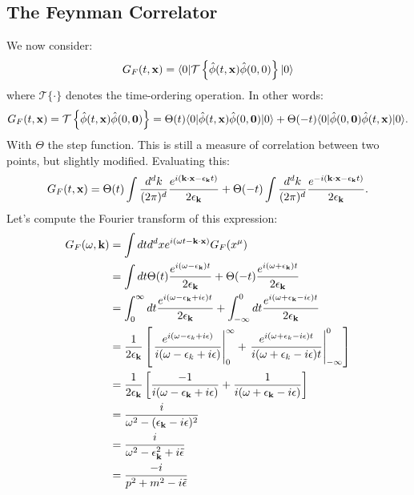 \subsection{The Feynman Correlator}
We now consider:
\begin{equation}
    G_F(t, \mathbf{x}) = \langle 0 \rvert\mathcal{T}\set{\hat{\phi}(t, \ensuremath{\mathbf{x}})\hat{\phi}(0, 0)}\lvert 0 \rangle
\end{equation}
where $\mathcal{T}\{\cdot\}$ denotes the time-ordering operation. In other words:
\begin{equation}
    G_F(t, \mathbf{x}) = \mathcal{T}\set{\hat{\phi}(t, \ensuremath{\mathbf{x}})\hat{\phi}(0, \ensuremath{\mathbf{0}})} = \Theta(t)\langle 0 \rvert\hat{\phi}(t, \mathbf{x})\hat{\phi}(0, \mathbf{0})\lvert 0 \rangle + \Theta(-t)\langle 0 \rvert\hat{\phi}(0, \mathbf{0})\hat{\phi}(t, \mathbf{x})\lvert 0 \rangle.
\end{equation}
With $\Theta$ the step function. This is still a measure of correlation between two points, but slightly modified. Evaluating this:
\begin{equation}
    G_F(t, \mathbf{x}) = \Theta(t)\int \frac{d^dk}{(2\pi)^d}\frac{e^{i(\mathbf{k} \cdot \mathbf{x} - \epsilon_{\mathbf{k}}t)}}{2\epsilon_{\mathbf{k}}} + \Theta(-t)\int \frac{d^dk}{(2\pi)^d}\frac{e^{-i(\mathbf{k} \cdot \mathbf{x} - \epsilon_{\mathbf{k}}t)}}{2\epsilon_{\mathbf{k}}}.
\end{equation}
Let's compute the Fourier transform of this expression:
\begin{equation}
    \begin{split}
        G_F(\omega, \mathbf{k}) &= \int dt d^dx e^{i(\omega t - \mathbf{k} \cdot \mathbf{x})}G_F(x^\mu)
        \\ &= \int dt \Theta(t)\frac{e^{i(\omega - \epsilon_{\mathbf{k}})t}}{2\epsilon_{\mathbf{k}}} + \Theta(-t)\frac{e^{i(\omega + \epsilon_{\mathbf{k}})t}}{2\epsilon_{\mathbf{k}}}
        \\ &= \int_0^\infty dt \frac{e^{i(\omega - \epsilon_{\mathbf{k}} + i\epsilon)t}}{2\epsilon_{\mathbf{k}}} + \int_{-\infty}^0dt \frac{e^{i(\omega + \epsilon_{\mathbf{k}} - i\epsilon)t}}{2\epsilon_{\mathbf{k}}}
        \\ &= \frac{1}{2\epsilon_{\mathbf{k}}}\left[\left.\frac{e^{i(\omega - \epsilon_k + i\epsilon)}}{i(\omega - \epsilon_k + i\epsilon)}\right|_0^\infty +\left.\frac{e^{i(\omega + \epsilon_k - i\epsilon)t}}{i(\omega + \epsilon_k - i\epsilon)t}\right|_{-\infty}^0\right]
        \\ &= \frac{1}{2\epsilon_{\mathbf{k}}}\left[\frac{-1}{i(\omega - \epsilon_{\mathbf{k}} + i\epsilon)} + \frac{1}{i(\omega + \epsilon_{\mathbf{k}} - i\epsilon)}\right]
        \\ &= \frac{i}{\omega^2 - (\epsilon_{\mathbf{k}} - i\epsilon)^2}
        \\ &= \frac{i}{\omega^2 - \epsilon_{\mathbf{k}}^2 + i\tilde{\epsilon}}
        \\ &= \frac{-i}{p^2 + m^2 - i\tilde{\epsilon}}
    \end{split}
\end{equation}
